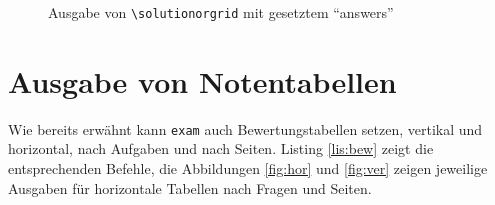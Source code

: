 \begin{figure}
\caption{Ausgabe von \texttt{\textbackslash solutionorgrid} mit gesetztem \enquote{answers}}\label{fig:solbox2}
\end{figure}








\section{Ausgabe von Notentabellen}

Wie bereits erwähnt kann \texttt{exam} auch Bewertungstabellen setzen, vertikal und horizontal, nach Aufgaben und nach Seiten. Listing \ref{lis:bew} zeigt die entsprechenden Befehle, die Abbildungen \ref{fig:hor} und \ref{fig:ver} zeigen jeweilige Ausgaben für horizontale Tabellen nach Fragen und Seiten.

